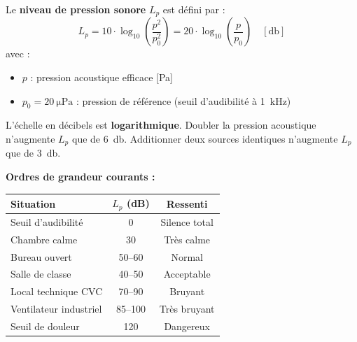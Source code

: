 \begin{definition}
Le \textbf{niveau de pression sonore} $L_p$ est défini par :
\[
  L_p = 10 \cdot \log_{10}\!\left(\frac{p^2}{p_0^2}\right) = 20 \cdot \log_{10}\!\left(\frac{p}{p_0}\right) \quad [\si{\decibel}]
\]
avec :
\begin{itemize}
  \item $p$ : pression acoustique efficace [\si{\pascal}]
  \item $p_0 = 20~\si{\micro\pascal}$ : pression de référence (seuil d'audibilité à 1~\si{\kilo\hertz})
\end{itemize}
\end{definition}

\begin{attention}
L'échelle en décibels est \textbf{logarithmique}. Doubler la pression acoustique n'augmente $L_p$ que de 6~\si{\decibel}. Additionner deux sources identiques n'augmente $L_p$ que de 3~\si{\decibel}.
\end{attention}

\textbf{Ordres de grandeur courants :}

\begin{center}
\begin{tabular}{lcc}
\toprule
Situation & $L_p$ (dB) & Ressenti \\
\midrule
Seuil d'audibilité & 0 & Silence total \\
Chambre calme & 30 & Très calme \\
Bureau ouvert & 50--60 & Normal \\
Salle de classe & 40--50 & Acceptable \\
Local technique CVC & 70--90 & Bruyant \\
Ventilateur industriel & 85--100 & Très bruyant \\
Seuil de douleur & 120 & Dangereux \\
\bottomrule
\end{tabular}
\end{center}


